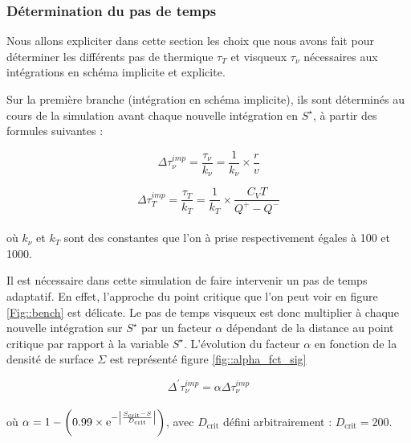 \subsubsection{Détermination du pas de temps\label{sec::pas_de_temps}}

Nous allons expliciter dans cette section les choix que nous avons fait pour
déterminer les différents pas de thermique $\tau_T$ et visqueux $\tau_\nu$
nécessaires aux intégrations en schéma implicite et explicite.

Sur la première branche (intégration en schéma implicite), ils sont déterminés
au cours de la simulation avant chaque nouvelle intégration en $S^\star$, à
partir des formules suivantes : 

\begin{equation}
	\Delta \tau_\nu^{imp} = \frac{\tau_\nu}{k_{\nu}} = \frac{1}{k_{\nu}} \times \frac{r}{v}
\end{equation}

\begin{equation}
	\Delta \tau_{T}^{imp} = \frac{\tau_{T}}{k_{T}}= \frac{1}{k_{T}} \times \frac{C_{V} T}{Q^{+} - Q^{-}}
\end{equation} \\

où $k_{\nu}$ et $k_{T}$ sont des constantes que l'on à prise respectivement égales à 100 et 1000.

Il est nécessaire dans cette simulation de faire intervenir un pas de temps
adaptatif. En effet, l'approche du point critique que l'on peut voir en figure
\ref{Fig::bench} est délicate. Le pas de temps visqueux est donc multiplier à
chaque nouvelle intégration sur $S^\star$ par un facteur $\alpha$ dépendant de la
distance au point critique par rapport à la variable $S^\star$. L'évolution du facteur $\alpha$ en fonction de la densité de surface $\Sigma$ est représenté figure \ref{fig::alpha_fct_sig} 


\begin{equation}
	\Delta^{'} \tau_{\nu}^{imp} = \alpha \Delta \tau_{\nu}^{imp}
\end{equation} \\

où $\alpha = 1 - \left( 0.99 \times \e^{- \left| \frac{S_\textrm{crit} - S}{D_\textrm{crit}} \right|} \right)$, avec $D_\textrm{crit}$ défini arbitrairement : $D_\textrm{crit} = 200$.


